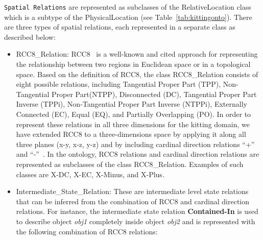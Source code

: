 \texttt{Spatial Relations} are represented as subclasses of the \textsf{RelativeLocation} class which is a subtype of the \textsf{PhysicalLocation} (see Table~\ref{tab:kittingonto}). There are three types of spatial relations, each represented in a separate class as described below:
\begin{itemize}
 \item \textsf{RCC8\_Relation}: RCC8~\cite{Wolter.KR.2000} is a well-known and cited approach for representing the relationship between two regions in Euclidean space or in a topological space. Based on the definition of RCC8, the class \textsf{RCC8\_Relation} consists of eight possible relations, including Tangential Proper Part (TPP), Non-Tangential Proper Part(NTPP), Disconnected (DC), Tangential Proper Part Inverse (TPPi), Non-Tangential Proper Part Inverse (NTPPi), Externally Connected (EC), Equal (EQ), and Partially Overlapping (PO). In order to represent these relations in all three dimensions for the kitting domain, we have extended RCC8 to a three-dimensions space by applying it along all three planes (x-y, x-z, y-z) and by including cardinal direction relations ``+'' and ``-''~\cite{SCHLENOFF.ECDRM.2012}. In the ontology, RCC8 relations and cardinal direction relations are represented as subclasses of the class \textsf{RCC8\_Relation}. Examples of such classes are \textsf{X-DC}, \textsf{X-EC}, \textsf{X-Minus}, and \textsf{X-Plus}.

 \item \textsf{Intermediate\_State\_Relation}: These are intermediate level state relations that can be inferred from the combination of RCC8 and cardinal direction relations. For  instance, the intermediate state relation \textbf{Contained-In} is used to describe object \textit{obj1} completely inside object \textit{obj2} and is represented with the following combination of RCC8 relations:


\end{itemize}
